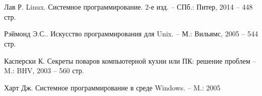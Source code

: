 \newpage
\section*{}

\begin{thebibliography}{00}

Лав Р. Linux. Системное программирование. 2-е изд. -- СПб.: Питер, 2014 -- 448 стр.

Рэймонд Э.С.. Искусство программирования для Unix. -- М.: Вильямс, 2005 -- 544 стр.

Касперски К. Секреты поваров компьютерной кухни или ПК: решение проблем -- M.: BHV, 2003 -- 560 стр.

Харт Дж. Системное программирование в среде Windows. -- M.: 2005


\end{thebibliography}
